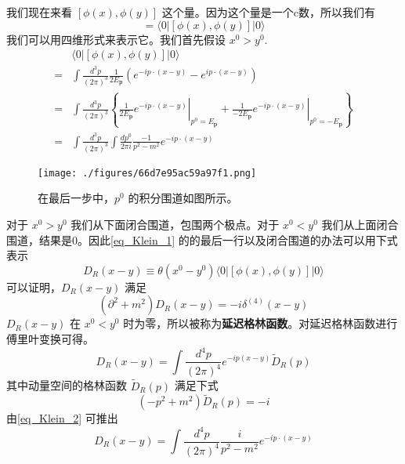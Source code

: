 我们现在来看 $[\phi(x),\phi(y)]$ 这个量。因为这个量是一个c数，所以我们有
\begin{equation}
[\phi(x),\phi(y)] = \langle 0 | [\phi(x),\phi(y)] | 0 \rangle
\end{equation}
我们可以用四维形式来表示它。我们首先假设 $x^0>y^0$.
\begin{equation}\label{eq_Klein_1}
\begin{aligned}
& \langle 0|[\phi(x), \phi(y)]| 0\rangle\\
=&\int \frac{d^{3} p}{(2 \pi)^{3}} \frac{1}{2 E_{\mathbf{p}}}\left(e^{-i p \cdot(x-y)}-e^{i p \cdot(x-y)}\right) \\ 
=& \int \frac{d^{3} p}{(2 \pi)^{3}}\left\{\left.\frac{1}{2 E_{\mathbf{p}}} e^{-i p \cdot(x-y)}\right|_{p^{0}=E_{\mathbf{p}}}+\left.\frac{1}{-2 E_{\mathbf{p}}} e^{-i p \cdot(x-y)}\right|_{p^{0}=-E_{\mathbf{p}}}\right\} \\
=& \int \frac{d^{3} p}{(2 \pi)^{3}} \int \frac{d p^{0}}{2 \pi i} \frac{-1}{p^{2}-m^{2}} e^{-i p \cdot(x-y)} 
\end{aligned}
\end{equation}
\begin{figure}[ht]
\centering
\texttt{[image: ./figures/66d7e95ac59a97f1.png]}
\caption{在最后一步中，$p^0$ 的积分围道如图所示。} \label{fig_Klein_1}
\end{figure}
对于 $x^0>y^0$ 我们从下面闭合围道，包围两个极点。对于 $x^0<y^0$ 我们从上面闭合围道，结果是0。因此\autoref{eq_Klein_1} 的的最后一行以及闭合围道的办法可以用下式表示
\begin{equation}
D_R(x-y)\equiv \theta(x^0-y^0)\langle 0 | [\phi(x),\phi(y)]|0 \rangle
\end{equation}
可以证明，$D_R(x-y)$ 满足
\begin{equation}
(\partial^2+m^2)D_R(x-y) = -i \delta^{(4)}(x-y)
\end{equation}
$D_R(x-y)$ 在 $x^0<y^0$ 时为零，所以被称为\textbf{延迟格林函数}。对延迟格林函数进行傅里叶变换可得。
\begin{equation}
D_R(x-y) = \int \frac{d^4p}{(2\pi)^4} e^{-ip(x-y)} \tilde D_R (p)
\end{equation}
其中动量空间的格林函数 $\tilde D_R(p)$ 满足下式
\begin{equation}\label{eq_Klein_2}
(-p^2+m^2) \tilde D_R(p) = -i
\end{equation}
由\autoref{eq_Klein_2} 可推出
\begin{equation}
D_R (x-y) = \int \frac{d^4p}{(2\pi)^4} \frac{i}{p^2-m^2} e^{-ip\cdot(x-y)}
\end{equation}
